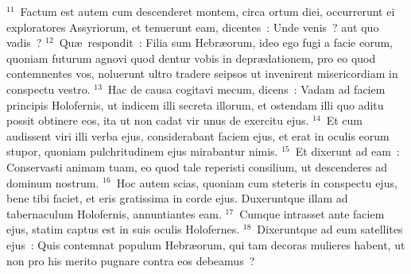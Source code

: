 ${}^{11}$~Factum est autem cum descenderet montem, circa ortum diei, occurrerunt ei exploratores Assyriorum, et tenuerunt eam, dicentes~: Unde venis~? aut quo vadis~?
${}^{12}$~Qu\ae\ respondit~: Filia sum Hebr\ae orum, ideo ego fugi a facie eorum, quoniam futurum agnovi quod dentur vobis in depr\ae dationem, pro eo quod contemnentes vos, noluerunt ultro tradere seipsos ut invenirent misericordiam in conspectu vestro.
${}^{13}$~Hac de causa cogitavi mecum, dicens~: Vadam ad faciem principis Holofernis, ut indicem illi secreta illorum, et ostendam illi quo aditu possit obtinere eos, ita ut non cadat vir unus de exercitu ejus.
${}^{14}$~Et cum audissent viri illi verba ejus, considerabant faciem ejus, et erat in oculis eorum stupor, quoniam pulchritudinem ejus mirabantur nimis.
${}^{15}$~Et dixerunt ad eam~: Conservasti animam tuam, eo quod tale reperisti consilium, ut descenderes ad dominum nostrum.
${}^{16}$~Hoc autem scias, quoniam cum steteris in conspectu ejus, bene tibi faciet, et eris gratissima in corde ejus. Duxeruntque illam ad tabernaculum Holofernis, annuntiantes eam.
${}^{17}$~Cumque intrasset ante faciem ejus, statim captus est in suis oculis Holofernes.
${}^{18}$~Dixeruntque ad eum satellites ejus~: Quis contemnat populum Hebr\ae orum, qui tam decoras mulieres habent, ut non pro his merito pugnare contra eos debeamus~?


